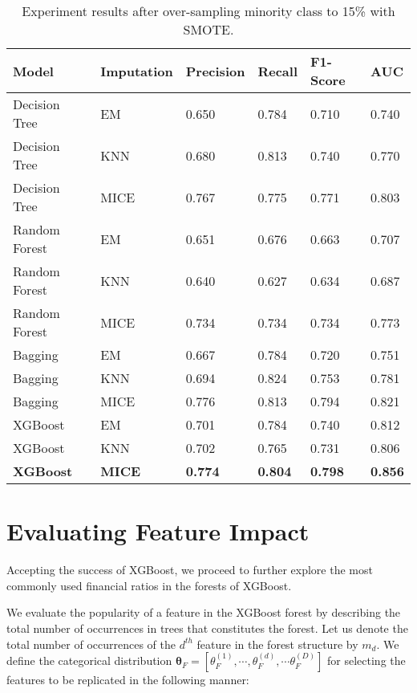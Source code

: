 \begin{table}[h!]
\begin{center}
 \begin{tabular}{ | p{3cm} | p{2cm} | p{1.75cm}| p{1.75cm} | p{1.75cm}| p{1.75cm} | }
 \hline
  Model & Imputation &  Precision  & Recall & F1-Score & AUC

  \\ [0.5ex] 
 \hline\hline
    
    Decision Tree & EM & 0.650 & 0.784 & 0.710 & 0.740 \\ \hline
    Decision Tree & KNN & 0.680 & 0.813 & 0.740 & 0.770 \\ \hline
    Decision Tree & MICE & 0.767 & 0.775 & 0.771 & 0.803 \\ \hline
    Random Forest & EM & 0.651 & 0.676 & 0.663 & 0.707 \\ \hline
    Random Forest & KNN & 0.640 & 0.627 & 0.634 & 0.687 \\ \hline
    Random Forest & MICE & 0.734 & 0.734 & 0.734 & 0.773 \\ \hline
    Bagging & EM & 0.667 & 0.784 & 0.720 & 0.751 \\ \hline
    Bagging & KNN & 0.694 & 0.824 & 0.753 & 0.781 \\ \hline
    Bagging & MICE & 0.776 & 0.813 & 0.794 & 0.821 \\ \hline
    XGBoost & EM & 0.701 & 0.784 & 0.740 & 0.812 \\ \hline
    XGBoost & KNN & 0.702 & 0.765 & 0.731 & 0.806 \\ \hline
    \textbf{XGBoost} & \textbf{MICE} & \textbf{0.774} & \textbf{0.804} & \textbf{0.798} & \textbf{0.856} \\ \hline

\end{tabular}
\end{center}

    \caption{Experiment results after over-sampling minority class to 15\% with SMOTE.}
\label{table:results}
\end{table}


\section{Evaluating Feature Impact}
Accepting the success of XGBoost, we proceed to further explore the most commonly used financial ratios in the forests of XGBoost.

We evaluate the popularity of a feature in the XGBoost forest by describing the total number of occurrences in trees that constitutes the forest. Let us denote the total number of occurrences of the $d^{th}$ feature in the forest structure by $m_{d}$. We define the categorical distribution $\boldsymbol{\theta}_{F}=\left[\theta_{F}^{(1)}, \cdots, \theta_{F}^{(d)}, \cdots \theta_{F}^{(D)}\right]$ for selecting the features to be replicated in the following manner:

